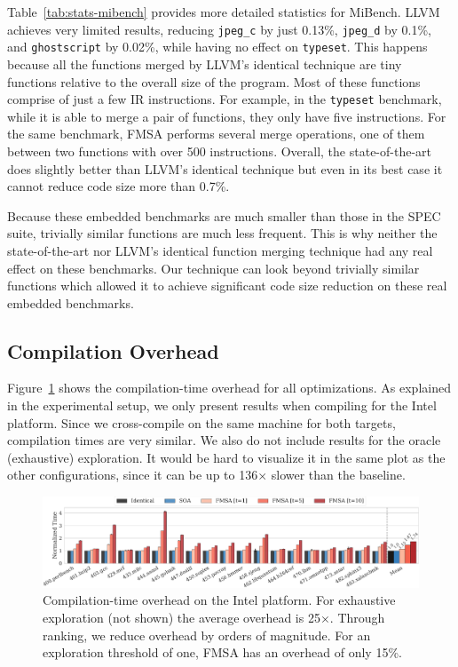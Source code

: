 Table~\ref{tab:stats-mibench} provides more detailed statistics for MiBench.
LLVM achieves very limited results, reducing \texttt{jpeg\_c} by just 0.13\%,
\texttt{jpeg\_d} by 0.1\%, and \texttt{ghostscript} by 0.02\%, while having no effect on \texttt{typeset}.
This happens because all the functions merged by LLVM's identical technique are tiny functions relative to the overall size of the program.
Most of these functions comprise of just a few IR instructions. For example, in the \texttt{typeset} benchmark,
while it is able to merge a pair of functions, they only have five instructions. For the same benchmark, FMSA performs several merge operations, one of them between two functions with over 500 instructions.
Overall, the state-of-the-art does slightly better than LLVM's identical technique but even in its best case it cannot reduce code size more than 0.7\%.

Because these embedded benchmarks are much smaller than those in the SPEC suite, trivially similar functions are much less frequent.
This is why neither the state-of-the-art nor LLVM's identical function merging technique had any real effect on these benchmarks.
Our technique can look beyond trivially similar functions which allowed it to achieve significant code size reduction on these real embedded benchmarks.

\subsection{Compilation Overhead}

Figure~\ref{fig:compilation-time} shows the compilation-time overhead for all optimizations. As explained in the experimental setup, we
only present results when compiling for the Intel platform. Since we cross-compile on the same machine for both targets, compilation times
are very similar. We also do not include results for the oracle (exhaustive) exploration. It would be hard to visualize it in the same plot
as the other configurations, since it can be up to 136$\times$ slower than the baseline.

\begin{figure}[t]
  \centering
  \includegraphics[width=\linewidth]{src/merging-optimisation/figs/compilation-time.pdf}
	\caption{Compilation-time overhead on the Intel platform. For exhaustive exploration (not shown) the average overhead is 25$\times$. Through ranking, we reduce overhead by orders of magnitude. For an exploration threshold of one, FMSA has an overhead of only 15\%.}
  \label{fig:compilation-time}
\end{figure}

